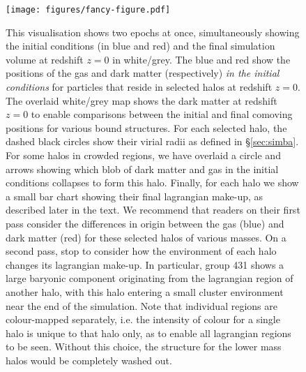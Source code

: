 \begin{figure}
	\centering
	\vspace{0.5cm}
	\texttt{[image: figures/fancy-figure.pdf]}
  \caption{ This visualisation shows two epochs at once, simultaneously
  showing the initial conditions (in blue and red) and the final simulation
  volume at redshift $z=0$ in white/grey. The blue and red show the positions
  of the gas and dark matter (respectively) \emph{in the initial conditions}
  for particles that reside in selected halos at redshift $z=0$. The overlaid
  white/grey map shows the dark matter at redshift $z=0$ to enable
  comparisons between the initial and final comoving positions for various
  bound structures. For each selected halo, the dashed black circles show
  their virial radii as defined in \S \ref{sec:simba}. For some halos in
  crowded regions, we have overlaid a circle and arrows showing which blob of
  dark matter and gas in the initial conditions collapses to form this halo.
  Finally, for each halo we show a small bar chart showing their final
  lagrangian make-up, as described later in the text. We recommend that
  readers on their first pass consider the differences in origin between the
  gas (blue) and dark matter (red) for these selected halos of various
  masses. On a second pass, stop to consider how the environment of each halo
  changes its lagrangian make-up. In particular, group 431 shows a large
  baryonic component originating from the lagrangian region of another halo,
  with this halo entering a small cluster environment near the end of the
  simulation. Note that individual regions are colour-mapped separately, i.e.
  the intensity of colour for a single halo is unique to that halo only, as
  to enable all lagrangian regions to be seen. Without this choice, the
  structure for the lower mass halos would be completely washed out.}
	\vspace{1cm}
	\label{fig:bigtransferpic}
\end{figure}


